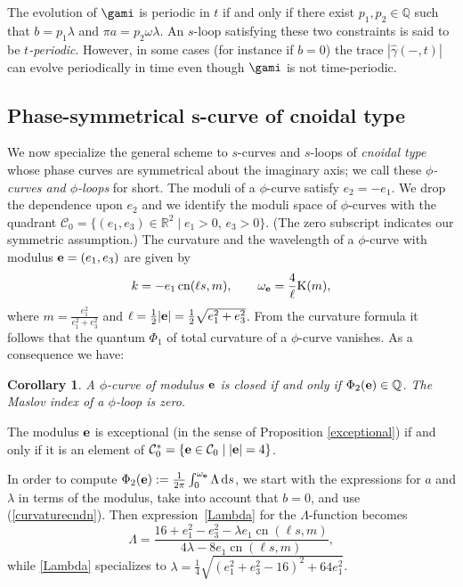 \documentclass[pdftex]{sigma}
\newcommand\kk{k} %
\def\gam{\gamma} %
\def\R{\mathbb R}
\newcommand\be{{\bf e}}
\newcommand\gamf{\widehat{\gam}} %
\newcommand\cn{\operatorname{cn}}
\numberwithin{equation}{section}
\newtheorem{Corollary}[Theorem]{Corollary}
\begin{document}
\begin{Remark} \label{timeevolution2} The evolution of $\gami$ is periodic in $t$ if and only if there exist $p_1,p_2\in {\mathbb Q}$ such that $b=p_1\lambda$ and
 $\pi a= p_2\omega\lambda$. An $s$-loop satisfying these two constraints is said to be {\it $t$-periodic}. However, in some cases (for instance if $b=0$) the trace $|\gamf(-,t)|$ can evolve periodically in time even though $\gami$ is not time-periodic.
\end{Remark}

\subsection[Phase-symmetrical s-curve of cnoidal type]{Phase-symmetrical $\boldsymbol{s}$-curve of cnoidal type}

We now specialize the general scheme to $s$-curves and $s$-loops of \emph{cnoidal type} whose phase curves are symmetrical about the imaginary axis; we call these {\it $\phi$-curves and $\phi$-loops} for short.
The moduli of a $\phi$-curve satisfy
$e_2=-e_1$. We drop the dependence upon $e_2$ and we identify the moduli space
of $\phi$-curves with the quadrant
${\mathcal C}_0=\bigl\{(e_1,e_3)\in \R^2 \mid e_1>0, \, e_3>0\bigr\}$.
(The zero subscript indicates our symmetric assumption.)
The curvature and the wavelength of a $\phi$-curve with modulus $\be=(e_1,e_3)$ are given by
\begin{equation}\label{curvaturecndn}
\kk =
-e_1\cn(\ell s,m),\qquad
\omega_\be=
\frac{4}{\ell}{\rm K}(m),
\end{equation}
where $m=\frac{e_1^2}{e_1^2+e_3^2}$ and $\ell = \frac12 |\be|=\frac12 \sqrt{e_1^2 + e_3^2}$.
From the curvature formula it follows that the quantum $\Phi_1$ of total curvature of a $\phi$-curve vanishes. As a consequence we have:

\begin{Corollary} A $\phi$-curve of modulus $\be$ is closed if and only if $\Phi_2(\be)\in {\mathbb Q}$. The Maslov index of a $\phi$-loop is zero.
\end{Corollary}

\begin{Remark} The modulus $\be$ is exceptional (in the sense of Proposition \ref{exceptional}) if and only if it is an element of ${\mathcal C}^{*}_0=\{\be\in {\mathcal C}_0 \mid |\be|=4\}$.
\end{Remark}

In order to compute $\Phi_2(\be):=\frac{1}{2\pi}\int_0^{\omega_\be} \Lambda \, {\rm d}s$, we start with the expressions for $a$ and $\lambda$ in terms of the modulus, take into account that $b=0$, and use (\ref{curvaturecndn}). Then expression~\eqref{Lambda} for the $\Lambda$-function becomes
\begin{equation}\label{Lambda2} \Lambda = \dfrac{ 16+e_1^2-e_3^2 -\lambda e_1 \cn(\ell s, m)}{4\lambda - 8 e_1 \cn(\ell s, m)},
\end{equation}
while \eqref{Lambda} specializes to $\lambda = \tfrac14 \sqrt{(e_1^2+e_3^2-16)^2 + 64 e_1^2}$.
\end{document}
